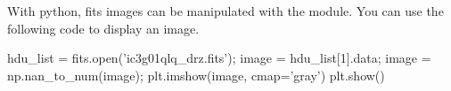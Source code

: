 \begin{pcomment}
\begin{premark}
 With python, fits images can be manipulated with the  module. You can use the following code to display an image.
\end{premark}
 \begin{python}
hdu_list = fits.open('ic3g01qlq_drz.fits');
image = hdu_list[1].data;
image = np.nan_to_num(image);
plt.imshow(image, cmap='gray')
plt.show()
 \end{python}
\end{pcomment}
